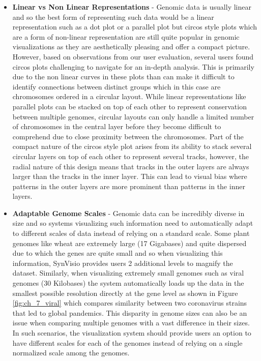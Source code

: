 \begin{itemize}
    \item \textbf{Linear vs Non Linear Representations} - Genomic data is usually linear and so the best form of representing such data would be a linear representation such as a dot plot or a parallel plot but circos style plots which are a form of non-linear representation are still quite popular in genomic visualizations as they are aesthetically pleasing and offer a compact picture. However, based on observations from our user evaluation, several users found circos plots challenging to navigate for an in-depth analysis. This is primarily due to the non linear curves in these plots than can make it difficult to identify connections between distinct groups which in this case are chromosomes ordered in a circular layout. While linear representations like parallel plots can be stacked on top of each other to represent conservation between multiple genomes, circular layouts can only handle a limited number of chromosomes in the central layer before they become difficult to comprehend due to close proximity between the chromosomes. Part of the compact nature of the circos style plot arises from its ability to stack several circular layers on top of each other to represent several tracks, however, the radial nature of this design means that tracks in the outer layers are always larger than the tracks in the inner layer. This can lead to visual bias where patterns in the outer layers are more prominent than patterns in the inner layers.
    
    \item \textbf{Adaptable Genome Scales} - Genomic data can be incredibly diverse in size and so systems visualizing such information need to automatically adapt to different scales of data instead of relying on a standard scale. Some plant genomes like wheat are extremely large (17 Gigabases) and quite dispersed due to which the genes are quite small and so when visualizing this information, SynVisio provides users 2 additional levels to magnify the dataset. Similarly, when visualizing extremely small genomes such as viral genomes (30 Kilobases) the system automatically loads up the data in the smallest possible resolution directly at the gene level as shown in Figure \ref{fig:ch_7_viral} which compares similarity between two coronavirus strains that led to global pandemics. This disparity in genome sizes can also be an issue when comparing multiple genomes with a vast difference in their sizes. In such scenarios, the visualization system should provide users an option to have different scales for each of the genomes instead of relying on a single normalized scale among the genomes. 
\end{itemize}

